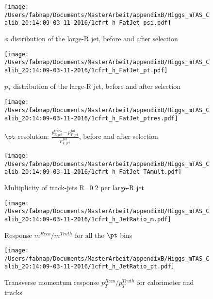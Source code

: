 \begin{figure}
 
\texttt{[image: /Users/fabnap/Documents/MasterArbeit/appendixB/Higgs\_mTAS\_Calib\_20:14:09-03-11-2016/1cfrt\_h\_FatJet\_psi.pdf]}
\caption{$\phi$ distribution of the large-R jet, before and after selection}
 
\end{figure}
 
\begin{figure}
 
\texttt{[image: /Users/fabnap/Documents/MasterArbeit/appendixB/Higgs\_mTAS\_Calib\_20:14:09-03-11-2016/1cfrt\_h\_FatJet\_pt.pdf]}
\caption{$p_{T}$ distribution of the large-R jet, before and after selection}
 
\end{figure}
 
\begin{figure}
 
\texttt{[image: /Users/fabnap/Documents/MasterArbeit/appendixB/Higgs\_mTAS\_Calib\_20:14:09-03-11-2016/1cfrt\_h\_FatJet\_ptres.pdf]}
\caption{$\pt$ resolution: $\frac{p_{T,jet}^{track}-p_{T,jet}^{fat}}{p_{T,jet}^{fat}}$, before and after selection }
 
\end{figure}
 
\begin{figure}
 
\texttt{[image: /Users/fabnap/Documents/MasterArbeit/appendixB/Higgs\_mTAS\_Calib\_20:14:09-03-11-2016/1cfrt\_h\_FatJet\_TAmult.pdf]}
\caption{Multiplicity of track-jets R=0.2 per large-R jet}
 
\end{figure}
\begin{figure}
 
\texttt{[image: /Users/fabnap/Documents/MasterArbeit/appendixB/Higgs\_mTAS\_Calib\_20:14:09-03-11-2016/1cfrt\_h\_JetRatio\_m.pdf]}
\caption{Response $m^{Reco} / m^{Truth}$ for all the $\pt$ bins}
 
\end{figure}
 
\begin{figure}
 
\texttt{[image: /Users/fabnap/Documents/MasterArbeit/appendixB/Higgs\_mTAS\_Calib\_20:14:09-03-11-2016/1cfrt\_h\_JetRatio\_pt.pdf]}
\caption{Transverse momentum response $p_{T}^{Reco} / p_{T}^{Truth}$ for calorimeter and tracks}
 
\end{figure}
 
